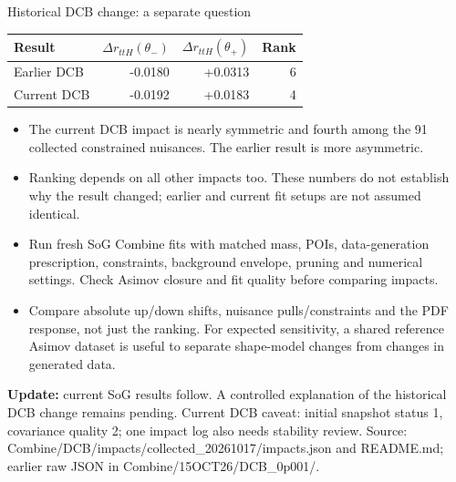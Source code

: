 \documentclass[aspectratio=169,10pt]{beamer}
\begin{document}
\begin{frame}{Historical DCB change: a separate question}
\small
\begin{center}
\begin{tabular}{lrrr}\toprule
Result & $\Delta r_{ttH}(\theta_-)$ & $\Delta r_{ttH}(\theta_+)$ & Rank\\\midrule
Earlier DCB & -0.0180 & +0.0313 & 6 \\
Current DCB & -0.0192 & +0.0183 & 4 \\
\bottomrule\end{tabular}
\end{center}
\begin{itemize}
\item The current DCB impact is nearly symmetric and fourth among the 91 collected constrained nuisances. The earlier result is more asymmetric.
\item Ranking depends on all other impacts too. These numbers do not establish why the result changed; earlier and current fit setups are not assumed identical.
\item Run fresh SoG Combine fits with matched mass, POIs, data-generation prescription, constraints, background envelope, pruning and numerical settings. Check Asimov closure and fit quality before comparing impacts.
\item Compare absolute up/down shifts, nuisance pulls/constraints and the PDF response, not just the ranking. For expected sensitivity, a shared reference Asimov dataset is useful to separate shape-model changes from changes in generated data.
\end{itemize}
\textbf{Update:} current SoG results follow. A controlled explanation of the historical DCB change remains pending.
\vfill\tiny Current DCB caveat: initial snapshot status 1, covariance quality 2; one impact log also needs stability review. Source: Combine/DCB/impacts/collected\_20261017/impacts.json and README.md; earlier raw JSON in Combine/15OCT26/DCB\_0p001/.
\end{frame}
\end{document}
